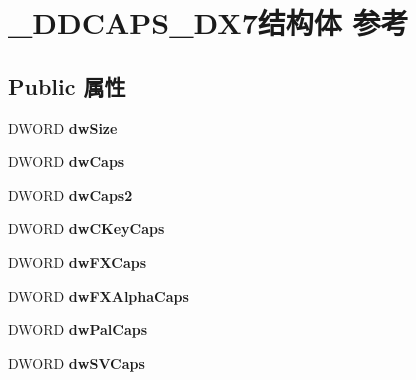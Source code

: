 \hypertarget{struct___d_d_c_a_p_s___d_x7}{}\section{\+\_\+\+D\+D\+C\+A\+P\+S\+\_\+\+D\+X7结构体 参考}
\label{struct___d_d_c_a_p_s___d_x7}
\subsection*{Public 属性}
\begin{DoxyCompactItemize}
\item 
\mbox{\label{struct___d_d_c_a_p_s___d_x7_a9f0d208cd4ac786784ac0f2ad5477a7f}} 
D\+W\+O\+RD {\bfseries dw\+Size}
\item 
\mbox{\label{struct___d_d_c_a_p_s___d_x7_a01890f4bbc59988abb896bea497e3011}} 
D\+W\+O\+RD {\bfseries dw\+Caps}
\item 
\mbox{\label{struct___d_d_c_a_p_s___d_x7_ab18c1676fc317fab496b185c7864a515}} 
D\+W\+O\+RD {\bfseries dw\+Caps2}
\item 
\mbox{\label{struct___d_d_c_a_p_s___d_x7_a6857b689a6e235c43387e94026824c80}} 
D\+W\+O\+RD {\bfseries dw\+C\+Key\+Caps}
\item 
\mbox{\label{struct___d_d_c_a_p_s___d_x7_ab86bebfb4b665f342d7def6417eb59ef}} 
D\+W\+O\+RD {\bfseries dw\+F\+X\+Caps}
\item 
\mbox{\label{struct___d_d_c_a_p_s___d_x7_a7d6131af26eed0a5de144f576d9a5390}} 
D\+W\+O\+RD {\bfseries dw\+F\+X\+Alpha\+Caps}
\item 
\mbox{\label{struct___d_d_c_a_p_s___d_x7_a0fd87d7a5a0a0c3bd58896e95a720709}} 
D\+W\+O\+RD {\bfseries dw\+Pal\+Caps}
\item 
\mbox{\label{struct___d_d_c_a_p_s___d_x7_a5e987b978adc743a88b3a1e7e78db3ba}} 
D\+W\+O\+RD {\bfseries dw\+S\+V\+Caps}
\item 
\mbox{\label{struct___d_d_c_a_p_s___d_x7_abcbf337bf650d262a37076e5bf5ea3d8}} 

\end{DoxyCompactItemize}
